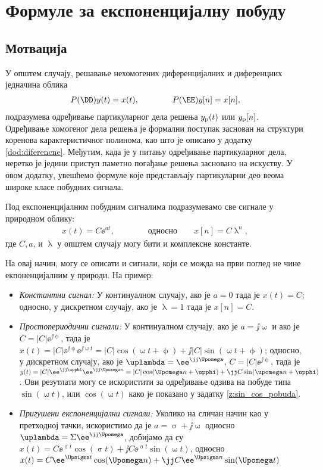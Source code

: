 \chapter{Формуле за експоненцијалну побуду} \label{dod:exp_response}

\section*{Мотвација}

У општем случају, решавање нехомогених диференцијалних и диференцних једначина облика 
\begin{eqnarray}
    P(\DD) y(t) = x(t), \qquad\qquad P(\EE)y[n] = x[n],
\end{eqnarray}
подразумева одређивање партикуларног дела решења $y_{\rm p}(t)$ или $y_{\rm p}[n]$. 
Одређивање хомогеног дела решења је формални поступак заснован на структури  коренова карактеристичног полинома, као што је описано
у додатку \ref{dod:diferencne}. Међутим, када је у питању одређивање партикуларног дела, неретко је једини приступ паметно погађање
решења засновано на искуству. У овом додатку, увешћемо формуле које представљају партикуларни део веома широке класе побудних сигнала. 

Под експоненцијалним побудним сигналима подразумевамо све сигнале у природном облику:
\begin{eqnarray}
    x(t) = C \ee^{at}, \qquad\qquad \text{односно}  \quad\quad x[n] = C \uplambda^n,
\end{eqnarray}
где $C, a$, и $\uplambda$ у општем случају могу бити и комплексне константе. 

На овај начин, могу се описати и сигнали, који се можда на први поглед не чине екпоненцијалним у природи. На пример:
\begin{itemize}
    \item \emph{Константни сигнал:} У континуалном случају, ако је $a = 0$ тада је $x(t) = C$; односно, у дискретном случају, 
    ако је $\uplambda = 1$ тада је $x[n] = C$.
    \item \emph{Простопериодични сигнали:} У континуалном случају, ако је $a = \jj\upomega$ и ако је 
    $C = |C| \ee^{\jj\upphi}$, тада је 
    $x(t) = |C| \ee^{\jj\upphi} \ee^{\jj\upomega t} = |C|\cos(\upomega t + \upphi) + \jj |C| \sin(\upomega t + \upphi)$; односно, у дискретном случају, 
    ако је $\uplambda = \ee^{\jj\Upomega}$,  $C = |C| \ee^{\jj\upphi}$, тада је $y(t) =
    |C| \ee^{\jj\upphi} \ee^{\jj\Upomega n} = |C|\cos(\Upomega n + \upphi) + \jj C \sin(\upomega n + \upphi)$.
    Ови резутлати могу се искористити за одређивање одзива на побуде типа $\sin(\upomega t)$, или 
    $\cos(\upomega t)$ како је показано у задатку \ref{z:sin_cos_pobuda}.
    \item \emph{Пригушени експоненцијални сигнали:} Уколико на сличан начин као у претходној тачки, искористимо да је 
    $a = \upsigma + \jj\upomega$ односно $\uplambda = \Sigma \ee^{\jj\Upomega}$, добијамо да су 
    $x(t) = C\ee^{\upsigma t}\cos(\upsigma t)+ \jj C\ee^{\upsigma t}\sin(\upomega t)$, односно
    $x(t) = C\ee^{\Upsigma t}\cos(\Upomega n)+ \jj C\ee^{\Upsigma n}\sin(\Upomega t)$
\end{itemize}

